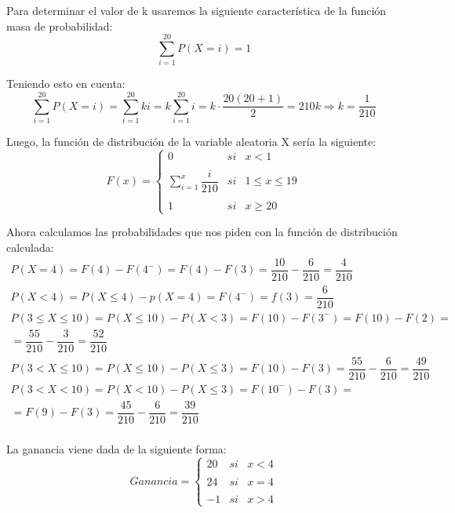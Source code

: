 \problem


\subproblem

Para determinar el valor de k usaremos la siguiente característica de la función masa de probabilidad:
\begin{equation*}
    \sum_{i=1}^{20} P(X=i) = 1
\end{equation*}

Teniendo esto en cuenta:
\begin{equation*}
    \sum_{i=1}^{20} P(X=i) = \sum_{i=1}^{20} ki = k \sum_{i=1}^{20} i = k \cdot \dfrac{20(20+1)}{2} = 210k \Rightarrow k = \dfrac{1}{210}
\end{equation*}

Luego, la función de distribución de la variable aleatoria X sería la siguiente:
\begin{equation*}
    F(x)= \left\{ \begin{array}{lcc}
             0 &   si  & x < 1 \\
             \\ \sum_{i=1}^x \dfrac{i}{210} &  si & 1 \leq x \leq 19 \\
             \\ 1 &  si  & x \geq 20
             \end{array}
   \right.
\end{equation*}
   
Ahora calculamos las probabilidades que nos piden con la función de distribución calculada:
\begin{gather*}
    P(X = 4) = F(4) - F(4^-) = F(4) - F(3) = \dfrac{10}{210} - \dfrac{6}{210} = \dfrac{4}{210}\\
    P(X < 4) = P(X \leq 4) - p(X = 4) = F(4^-) = f(3) = \dfrac{6}{210}\\
    P(3 \leq X \leq 10) = P(X \leq 10) - P(X < 3) = F(10) - F(3^-) = F(10) - F(2) = \\ = \dfrac{55}{210} - \dfrac{3}{210} = \dfrac{52}{210}\\
    P(3 < X \leq 10) = P(X \leq 10) - P(X \leq 3) = F(10) - F(3) = \dfrac{55}{210} - \dfrac{6}{210} = \dfrac{49}{210}\\
    P(3 < X < 10) = P(X < 10) - P(X \leq 3) = F(10^-) - F(3) = \\ = F(9) - F(3) = \dfrac{45}{210} - \dfrac{6}{210} = \dfrac{39}{210}\\
\end{gather*}

\subproblem

La ganancia viene dada de la siguiente forma:
\begin{equation*}
    Ganancia = \left\{ \begin{array}{lcc}
             20 &   si  & x < 4 \\
             \\ 24 &  si & x = 4 \\
             \\ -1 &  si  & x > 4
             \end{array}
   \right.
\end{equation*}

